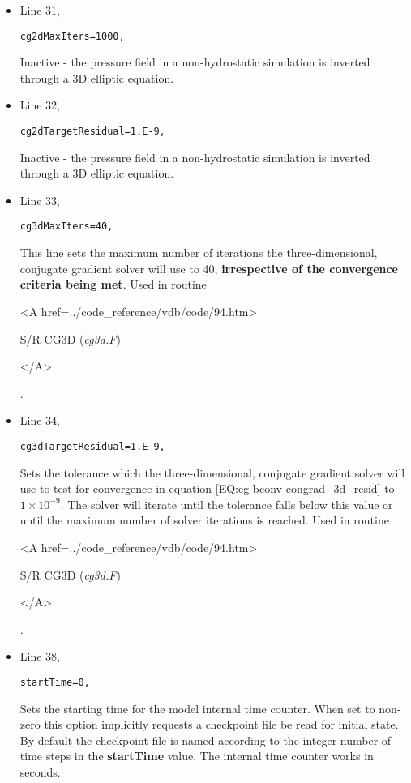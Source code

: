 \begin{itemize}
\item Line 31,
\begin{verbatim}
cg2dMaxIters=1000,
\end{verbatim}
Inactive - the pressure field in a non-hydrostatic simulation is inverted through a 3D
elliptic equation.


\item Line 32,
\begin{verbatim}
cg2dTargetResidual=1.E-9,
\end{verbatim}
Inactive - the pressure field in a non-hydrostatic simulation is inverted through a 3D
elliptic equation.


\item Line 33,
\begin{verbatim}
cg3dMaxIters=40,
\end{verbatim}
This line sets the  maximum number of iterations the three-dimensional, conjugate
gradient solver will use to 40, {\bf irrespective of the convergence 
criteria being met}. Used in routine
{\it
\begin{rawhtml} <A href=../code_reference/vdb/code/94.htm> \end{rawhtml}
S/R CG3D ({\it cg3d.F})
\begin{rawhtml} </A>\end{rawhtml}
}. 



\item Line 34,
\begin{verbatim}
cg3dTargetResidual=1.E-9,
\end{verbatim}
Sets the tolerance which the three-dimensional, conjugate
gradient solver will use to test for convergence in equation 
\ref{EQ:eg-bconv-congrad_3d_resid} to $1 \times 10^{-9}$.
The solver will iterate until the 
tolerance falls below this value or until the maximum number of
solver iterations is reached. Used in routine
{\it
\begin{rawhtml} <A href=../code_reference/vdb/code/94.htm> \end{rawhtml}
S/R CG3D ({\it cg3d.F})
\begin{rawhtml} </A>\end{rawhtml}
}. 


\item Line 38,
\begin{verbatim}
startTime=0,
\end{verbatim}
Sets the starting time for the model internal time counter.
When set to non-zero this option implicitly requests a 
checkpoint file be read for initial state.
By default the checkpoint file is named according to
the integer number of time steps in the {\bf startTime} value.
The internal time counter works in seconds.


\end{itemize}
